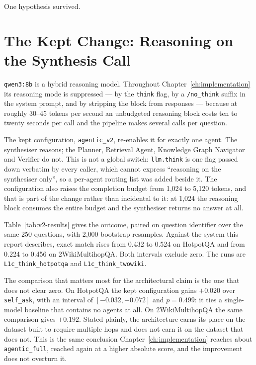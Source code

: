 One hypothesis survived.

\section{The Kept Change: Reasoning on the Synthesis Call}
\label{sec:improvement-kept}

\texttt{qwen3:8b} is a hybrid reasoning model. Throughout
Chapter~\ref{ch:implementation} its reasoning mode is suppressed --- by the
\texttt{think} flag, by a \texttt{/no\_think} suffix in the system prompt, and
by stripping the block from responses --- because at roughly 30--45 tokens per
second an unbudgeted reasoning block costs ten to twenty seconds per call and
the pipeline makes several calls per question.

The kept configuration, \texttt{agentic\_v2}, re-enables it for exactly one
agent. The synthesiser reasons; the Planner, Retrieval Agent, Knowledge Graph
Navigator and Verifier do not. This is not a global switch: \texttt{llm.think}
is one flag passed down verbatim by every caller, which cannot express
``reasoning on the synthesiser only'', so a per-agent routing list was added
beside it. The configuration also raises the completion budget from 1{,}024 to
5{,}120 tokens, and that is part of the change rather than incidental to it: at
1{,}024 the reasoning block consumes the entire budget and the synthesiser
returns no answer at all.



Table~\ref{tab:v2-results} gives the outcome, paired on question identifier
over the same 250 questions, with 2{,}000 bootstrap resamples. Against the
system this report describes, exact match rises from 0.432 to 0.524 on HotpotQA
and from 0.224 to 0.456 on 2WikiMultihopQA. Both intervals exclude zero. The
runs are \texttt{L1c\_think\_hotpotqa} and \texttt{L1c\_think\_twowiki}.

The comparison that matters most for the architectural claim is the one that
does not clear zero. On HotpotQA the kept configuration gains $+0.020$ over
\texttt{self\_ask}, with an interval of $[-0.032, +0.072]$ and $p = 0.499$: it
ties a single-model baseline that contains no agents at all. On
2WikiMultihopQA the same comparison gives $+0.192$. Stated plainly, the
architecture earns its place on the dataset built to require multiple hops and
does not earn it on the dataset that does not. This is the same conclusion
Chapter~\ref{ch:implementation} reaches about \texttt{agentic\_full}, reached
again at a higher absolute score, and the improvement does not overturn it.

